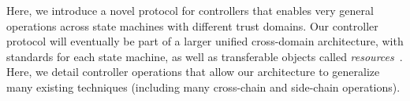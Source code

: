 \documentclass[a4paper,USenglish,cleveref, autoref, thm-restate, anonymous]{lipics-v2021}
\newcommand{\colort}[2]{{\color{#1}{#2}}}
\newcommand{\blue}[1]{\colort{blue}{#1}}
\newcommand{\purple}[1]{{\colort{purple}{#1}}}
\newcommand{\basecoin}{\blue{BaseCoin}}
\newcommand{\basechain}{\blue{BaseChain}}
\newcommand{\sidechain}{\purple{SideChain}}
\begin{document}
Here, we introduce a novel protocol for controllers that enables very general operations across state machines with different trust domains.
Our controller protocol will eventually be part of a larger unified cross-domain architecture, with standards for each state machine, as well as transferable objects called \emph{resources}~\cite{resource}.
Here, we detail controller operations that allow our architecture to generalize many existing techniques (including many cross-chain and side-chain operations). 




\end{document}
